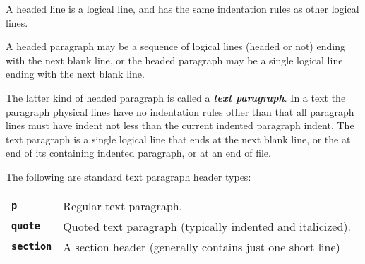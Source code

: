 \documentclass[12pt]{article}
\makeatletter
\newcommand{\TT}[1]{{\tt \bfseries #1}}
\newcommand{\key}[1]{{\bf \em #1}\index{#1}}
\newcommand{\ttkey}[1]{\TT{#1}\index{#1@{\tt #1}}}
\makeatother
\begin{document}
A headed line is a logical line, and has the same indentation rules
as other logical lines.

A headed paragraph may be a sequence of logical lines (headed or not)
ending with
the next blank line, or the headed paragraph may be a single logical
line ending with the next blank line.

The latter kind of headed paragraph
is called a \key{text paragraph}.  In a text the paragraph
physical lines have no indentation rules other than that all paragraph lines
must have indent not less than the current indented paragraph indent.
The text paragraph is a single logical line that
ends at the next blank line, or the at end of its
containing indented paragraph, or at an end of file.

The following are standard text paragraph header types:
\begin{center}
\begin{tabular}{lp{4in}}
\ttkey{p} & Regular text paragraph. \\
\ttkey{quote} & Quoted text paragraph (typically indented and italicized). \\
\ttkey{section} & A section header (generally contains just one short line) \\
\end{tabular}
\end{center}
\end{document}
